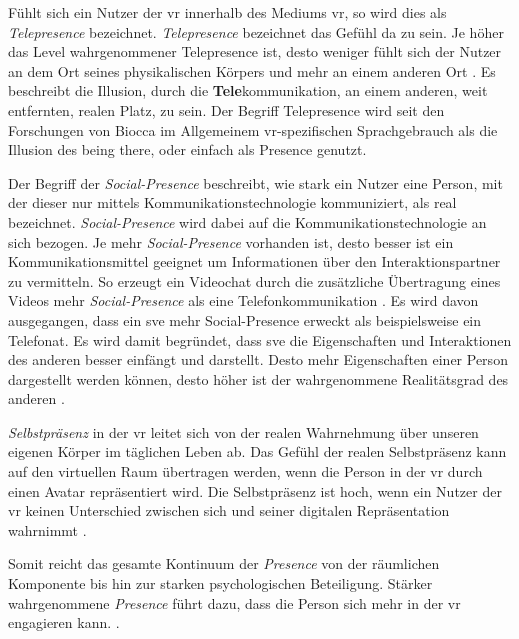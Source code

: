 \documentclass[a4paper,11pt]{article}%
\renewcommand{\\}{\vspace*{0.5\baselineskip} \newline}
\begin{document}
Fühlt sich ein Nutzer der \ac{vr} \dq{}innerhalb\dq{} des Mediums \ac{vr}, so wird dies als \textit{Telepresence} bezeichnet. \textit{Telepresence} bezeichnet das Gefühl \dq{}da zu sein\dq{}. Je höher das Level wahrgenommener Telepresence ist, desto weniger fühlt sich der Nutzer an dem Ort seines physikalischen Körpers und mehr an einem anderen Ort \citep[p.482]{nowak2003effect}. Es beschreibt die Illusion, durch die \textbf{Tele}kommunikation, an einem anderen, weit entfernten, realen Platz, zu sein. Der Begriff Telepresence wird seit den Forschungen von Biocca \cite[p.12]{biocca1999cyborg} im Allgemeinem \ac{vr}-spezifischen Sprachgebrauch als die Illusion des \dq{}being there\dq{}, oder einfach als \dq{}Presence\dq{} genutzt.

Der Begriff der \textit{Social-Presence} beschreibt, wie stark ein Nutzer eine Person, mit der dieser nur mittels Kommunikationstechnologie kommuniziert, als \dq{}real\dq{} bezeichnet. \textit{Social-Presence} wird dabei auf die Kommunikationstechnologie an sich bezogen. Je mehr \textit{Social-Presence} vorhanden ist, desto besser ist ein Kommunikationsmittel geeignet um Informationen über den Interaktionspartner zu vermitteln. So erzeugt ein Videochat durch die zusätzliche Übertragung eines Videos mehr \textit{Social-Presence} als eine Telefonkommunikation \citep[p.151]{gunawardena1995social}.
Es wird davon ausgegangen, dass ein \ac{sve} mehr Social-Presence erweckt als beispielsweise ein Telefonat. Es wird damit begründet, dass \ac{sve} die Eigenschaften und Interaktionen des anderen besser einfängt und darstellt. Desto mehr Eigenschaften einer Person dargestellt werden können, desto höher ist der wahrgenommene Realitätsgrad des anderen \citep[p. 5-8]{biocca2002defining}.

\textit{Selbstpräsenz} in der \ac{vr} leitet sich von der realen Wahrnehmung über unseren eigenen Körper im täglichen Leben ab. Das Gefühl der realen Selbstpräsenz kann auf den virtuellen Raum übertragen werden, wenn die Person in der \ac{vr} durch einen Avatar repräsentiert wird. Die Selbstpräsenz ist hoch, wenn ein Nutzer der \ac{vr} keinen Unterschied zwischen sich und seiner digitalen Repräsentation wahrnimmt \citep[p.439]{schultze2010embodiment}.

Somit reicht das gesamte Kontinuum der \textit{Presence} von der räumlichen Komponente bis hin zur starken psychologischen Beteiligung. Stärker wahrgenommene \textit{Presence} führt dazu, dass die Person sich mehr in der \ac{vr} engagieren kann. \citep{biocca2001criteria}.
\end{document}
